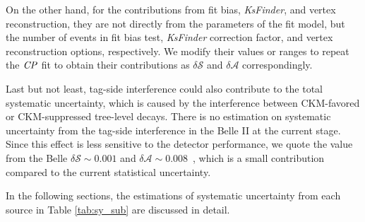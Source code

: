 On the other hand, for the contributions from fit bias, \textit{KsFinder}, and vertex reconstruction, they are not directly from the parameters of the fit model, but the number of events in fit bias test, \textit{KsFinder} correction factor, and vertex reconstruction options, respectively. We modify their values or ranges to repeat the $\it{CP}$ fit to obtain their contributions as $\delta \mathcal{S}$ and $\delta \mathcal{A}$ correspondingly. 

Last but not least, tag-side interference could also contribute to the total systematic uncertainty, which is caused by the interference between CKM-favored or CKM-suppressed tree-level decays.  There is no estimation on systematic uncertainty from the tag-side interference in the Belle II at the current stage. Since this effect is less sensitive to the detector performance, we quote the value from the Belle $\delta \mathcal{S} \sim 0.001$ and $\delta \mathcal{A} \sim 0.008$~\cite{yosuke2011measurement},  which is a small contribution compared to the current statistical uncertainty.

In the following sections, the estimations of systematic uncertainty from each source in Table \ref{tab:sy_sub} are discussed in detail.

